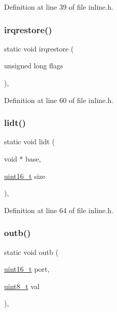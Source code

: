 Definition at line 39 of file inline.\+h.

\mbox{\label{a00035_a7dd6b2cd918b8cbca3c8b0381628ca83_a7dd6b2cd918b8cbca3c8b0381628ca83}} 
\subsubsection{\texorpdfstring{irqrestore()}{irqrestore()}}
{\footnotesize\ttfamily static void irqrestore (\begin{DoxyParamCaption}\item[{unsigned long}]{flags }\end{DoxyParamCaption})\hspace{0.3cm}{\ttfamily [inline]}, {\ttfamily [static]}}



Definition at line 60 of file inline.\+h.

\mbox{\label{a00035_a31967dec32575d3d398e6d289e888d1f_a31967dec32575d3d398e6d289e888d1f}} 
\subsubsection{\texorpdfstring{lidt()}{lidt()}}
{\footnotesize\ttfamily static void lidt (\begin{DoxyParamCaption}\item[{void $\ast$}]{base,  }\item[{\hyperlink{a00032_a273cf69d639a59973b6019625df33e30_a273cf69d639a59973b6019625df33e30}{uint16\+\_\+t}}]{size }\end{DoxyParamCaption})\hspace{0.3cm}{\ttfamily [inline]}, {\ttfamily [static]}}



Definition at line 64 of file inline.\+h.

\mbox{\label{a00035_aa37f5841c54156a4b14fc0d6f626b44f_aa37f5841c54156a4b14fc0d6f626b44f}} 
\subsubsection{\texorpdfstring{outb()}{outb()}}
{\footnotesize\ttfamily static void outb (\begin{DoxyParamCaption}\item[{\hyperlink{a00032_a273cf69d639a59973b6019625df33e30_a273cf69d639a59973b6019625df33e30}{uint16\+\_\+t}}]{port,  }\item[{\hyperlink{a00032_aba7bc1797add20fe3efdf37ced1182c5_aba7bc1797add20fe3efdf37ced1182c5}{uint8\+\_\+t}}]{val }\end{DoxyParamCaption})\hspace{0.3cm}{\ttfamily [inline]}, {\ttfamily [static]}}



